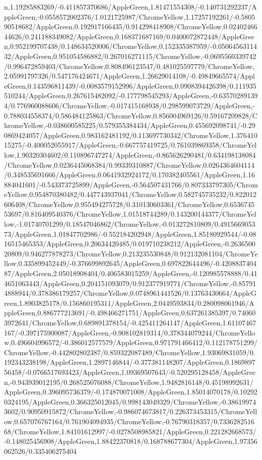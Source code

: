 {\begin{tikzternal}
n,1.19285883269/-0.411857370686/AppleGreen,1.81471554308/-0.140731292237/AppleGreen,-0.0558572002376/1.0121725987/ChromeYellow,1.17257192261/-0.580590518682/AppleGreen,0.192917166435/0.914298418908/ChromeYellow,0.0240246644626/0.241188349082/AppleGreen,0.168371687169/0.0400072872448/AppleGreen,0.952199707438/0.148634520006/ChromeYellow,0.152335387959/-0.0506456311432/AppleGreen,0.951054586882/0.267016271115/ChromeYellow,-0.0695560339742/0.996472859403/ChromeYellow,0.808496123547/0.481025597779/ChromeYellow,2.05991797326/0.547176424671/AppleGreen,1.26629014108/-0.49849665574/AppleGreen,0.143596811439/-0.0083579152996/AppleGreen,0.0908394426398/0.111935510244/AppleGreen,0.267615482092/-0.177798545293/AppleGreen,-0.635702891394/0.776960088606/ChromeYellow,-0.017415168938/0.298599073729/AppleGreen,-0.788034558374/0.586484125863/ChromeYellow,0.856004969126/0.59167209828/ChromeYellow,-0.038600585225/0.579355384434/AppleGreen,0.455692098741/-0.290869424057/AppleGreen,0.983162481192/0.113697730342/ChromeYellow,1.37641015275/-0.400052055917/AppleGreen,-0.667757419725/0.761039869358/ChromeYellow,1.90320304602/0.110896747274/AppleGreen,-0.865626290481/0.634198138084/ChromeYellow,0.0236445068384/0.99339310887/ChromeYellow,0.0264364604114/0.348535691666/AppleGreen,0.0641932924172/0.170382405561/AppleGreen,1.16884041601/-0.543373725899/AppleGreen,-0.564507431766/0.807333797305/ChromeYellow,0.954870380482/0.447743937041/ChromeYellow,0.582745735232/0.822012606408/ChromeYellow,0.955494275728/0.310130603361/ChromeYellow,0.653674553697/0.816409540376/ChromeYellow,1.01518744289/0.143200144377/ChromeYellow,-1.01740701299/0.18547046862/ChromeYellow,-0.013272810809/0.491566905373/AppleGreen,1.01847702986/-0.552184202948/AppleGreen,1.85180929544/-0.0816515465353/AppleGreen,0.20634420485/0.019710238212/AppleGreen,-0.263650020809/0.946277878273/ChromeYellow,0.213235530848/0.912132081104/ChromeYellow,0.335899452449/-0.376699892645/AppleGreen,0.697822644496/-0.420883740487/AppleGreen,2.05018908404/0.406583015259/AppleGreen,-0.120985578888/0.414651063443/AppleGreen,0.204151093079/0.912377919771/ChromeYellow,-0.857914888944/0.378386179257/ChromeYellow,0.0748961441526/0.13763430664/AppleGreen,1.8903825178/0.156860195311/AppleGreen,2.0449593834/0.280098061946/AppleGreen,0.886777213691/-0.498466271751/AppleGreen,0.637261385397/0.740603972641/ChromeYellow,0.689891378154/-0.425411264147/AppleGreen,1.61107467167/-0.397175900087/AppleGreen,-0.908102819314/0.378344079244/ChromeYellow,0.496604996572/-0.386012577579/AppleGreen,0.971791466412/0.112178751299/ChromeYellow,-0.442802802387/0.859322087489/ChromeYellow,1.93069831059/0.192343238198/AppleGreen,1.2897146844/-0.377381148207/AppleGreen,0.186989756458/-0.0766517693423/AppleGreen,1.09369507643/-0.520295128458/AppleGreen,-0.943939012195/0.268525076088/ChromeYellow,1.9482816148/0.45198992631/AppleGreen,0.396095736379/-0.174870071008/AppleGreen,1.85014070178/0.102920324195/AppleGreen,0.366325012045/0.998143049329/ChromeYellow,-0.386199743602/0.90950915872/ChromeYellow,-0.986074673817/0.226373453315/ChromeYellow,0.657076767164/0.761904094935/ChromeYellow,-0.76790318357/0.733628251668/ChromeYellow,1.84101612997/-0.0278508985821/AppleGreen,0.221282668573/-0.148025456908/AppleGreen,1.88422370818/0.168788677304/AppleGreen,1.97356062526/0.335406275404
\end{tikzternal}}
